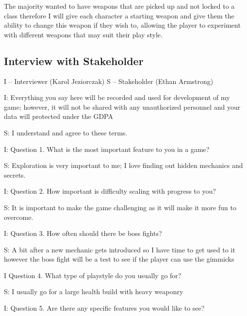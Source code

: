 \documentclass{article}
\newcommand{\parBr}{\vspace{5mm}}%
\begin{document}
\parBr

The majority wanted to have weapons that are picked up and not locked to a class therefore I will give each character a starting weapon and give them the ability to change this weapon if they wish to, allowing the player to experiment with different weapons that may suit their play style.

\subsection{Interview with Stakeholder}
I – Interviewer (Karol Jeziorczak) \linebreak
S – Stakeholder (Ethan Armstrong) 

\parBr

I: Everything you say here will be recorded and used for development of my game; however, it will not be shared with any unauthorized personnel and your data will protected under the GDPA 

\parBr

S: I understand and agree to these terms. 

\parBr

I: Question 1. What is the most important feature to you in a game? 

\parBr

S: Exploration is very important to me; I love finding out hidden mechanics and secrets. 

\parBr

I: Question 2. How important is difficulty scaling with progress to you? 

\parBr

S: It is important to make the game challenging as it will make it more fun to overcome. 

\parBr

I: Question 3. How often should there be boss fights? 

\parBr

S: A bit after a new mechanic gets introduced so I have time to get used to it however the boss fight will be a test to see if the player can use the gimmicks 

\parBr

I Question 4. What type of playstyle do you usually go for? 

\parBr

S: I usually go for a large health build with heavy weaponry 

\parBr

I: Question 5. Are there any specific features you would like to see? 
\end{document}

